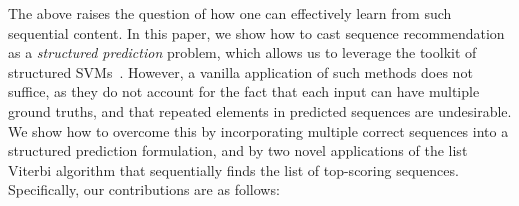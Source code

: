 The above raises the question of how one can effectively learn from such sequential content.
In this paper, we show how to cast sequence recommendation as a \emph{structured prediction} problem,
which allows us to leverage the toolkit of structured SVMs~\citep{tsochantaridis2005large}.
However, a vanilla application of such methods does not suffice,
as they do not account for the fact that each input can have multiple ground truths,
and that repeated elements in predicted sequences are undesirable.
We show how to overcome this by
incorporating multiple correct sequences into a structured prediction formulation,
and by two novel applications of the list Viterbi algorithm that sequentially finds the list of top-scoring sequences.
Specifically, our contributions are as follows:
